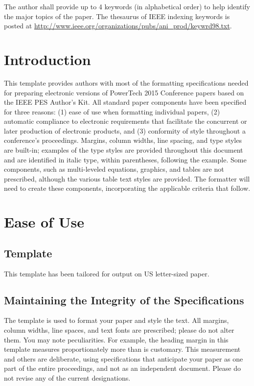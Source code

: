 \documentclass[conference]{IEEEtran}
\begin{document}
\begin{IEEEkeywords}
The author shall provide up to 4 keywords (in alphabetical order) to help identify the major topics of the paper. The thesaurus of IEEE indexing keywords is posted at \linebreak \url{http://www.ieee.org/organizations/pubs/ani_prod/keywrd98.txt}.
\end{IEEEkeywords}


\section{Introduction}

This template provides authors with most of the formatting specifications needed for preparing electronic versions of PowerTech 2015 Conference papers based on the IEEE PES Author's Kit. All standard paper components have been specified for three reasons: (1) ease of use when formatting individual papers, (2) automatic compliance to electronic requirements that facilitate the concurrent or later production of electronic products, and (3) conformity of style throughout a conference’s proceedings. Margins, column widths, line spacing, and type styles are built-in; examples of the type styles are provided throughout this document and are identified in italic type, within parentheses, following the example. Some components, such as multi-leveled equations, graphics, and tables are not prescribed, although the various table text styles are provided. The formatter will need to create these components, incorporating the applicable criteria that follow.

\section{Ease of Use}

\subsection{Template}
This template has been tailored for output on US letter-sized paper.

\subsection{Maintaining the Integrity of the Specifications}
The template is used to format your paper and style the text. All margins, column widths, line spaces, and text fonts are prescribed; please do not alter them. You may note peculiarities. For example, the heading margin in this template measures proportionately more than is customary. This measurement and others are deliberate, using specifications that anticipate your paper as one part of the entire proceedings, and not as an independent document. Please do not revise any of the current designations.
\end{document}
